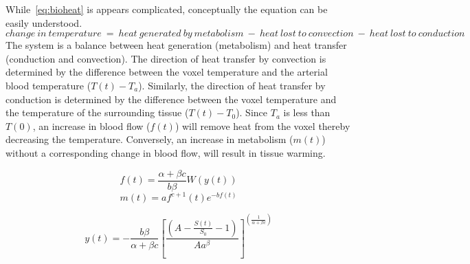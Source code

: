     While~\cref{eq:bioheat} is appears complicated, conceptually the equation can be easily understood.
    \begin{equation}    
      \label{eq:soteroexplaiend}
      change\ in\ temperature\ =\ heat\ generated\ by\ metabolism\ -\ heat\ lost\ to\ convection\ -\ heat\ lost\ to\ conduction
    \end{equation}
    The system is a balance between heat generation (metabolism) and heat transfer (conduction and convection).  The direction of heat transfer by convection is determined by the difference between the voxel temperature and the arterial blood temperature ($T(t) - T_a$).  Similarly, the direction of heat transfer by conduction is determined by the difference between the voxel temperature and the temperature of the surrounding tissue ($T(t) - T_0$).  Since $T_a$ is less than $T(0)$, an increase in blood flow ($f(t)$) will remove heat from the voxel thereby decreasing the temperature.  Conversely, an increase in metabolism ($m(t)$) without a corresponding change in blood flow, will result in tissue warming.  
    
    \begin{equation}
      \label{eq:f}
      f(t)=\frac{\alpha+\beta c}{b \beta}W(y(t))
    \end{equation}
    \begin{equation}
      \label{eq:m} 
      m(t)=af^{c+1}(t)e^{-bf(t)}
    \end{equation}
    
    \begin{equation}
    	y(t)=-\frac{b \beta}{\alpha+\beta c} \left[\frac{(A-\frac{S(t)}{S_{0}}-1)}{A a^{\beta}}\right]^{\left(\frac{1}{\alpha+\beta c}\right)} \label{eq:y} 
    \end{equation}
    
